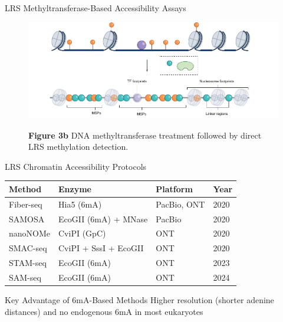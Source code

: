 \documentclass[aspectratio=169]{beamer}
\begin{document}
\begin{frame}{LRS Methyltransferase-Based Accessibility Assays}
  \begin{figure}
    \centering
    \includegraphics[height=0.5\textheight]{figures/fig3b.pdf}

    {\small \textbf{Figure 3b} \textbar{} DNA methyltransferase treatment followed by direct LRS methylation detection.}
  \end{figure}
\end{frame}

\begin{frame}{LRS Chromatin Accessibility Protocols}
  \begin{table}
    \footnotesize
    \begin{tabular}{|l|l|l|l|}
      \hline
      \rowcolor{conesaLightGray}
      \textbf{Method} & \textbf{Enzyme} & \textbf{Platform} & \textbf{Year} \\
      \hline
      Fiber-seq & Hia5 (6mA) & PacBio, ONT & 2020 \\
      \hline
      SAMOSA & EcoGII (6mA) + MNase & PacBio & 2020 \\
      \hline
      nanoNOMe & CviPI (GpC) & ONT & 2020 \\
      \hline
      SMAC-seq & CviPI + SssI + EcoGII & ONT & 2020 \\
      \hline
      STAM-seq & EcoGII (6mA) & ONT & 2023 \\
      \hline
      SAM-seq & EcoGII (6mA) & ONT & 2024 \\
      \hline
    \end{tabular}
  \end{table}

  \vspace{0.2cm}

  \begin{block}{Key Advantage of 6mA-Based Methods}
    Higher resolution (shorter adenine distances) and no endogenous 6mA in most eukaryotes
  \end{block}
\end{frame}
\end{document}
